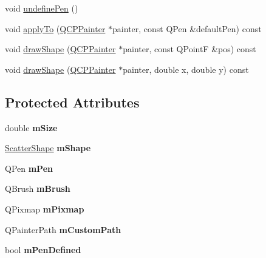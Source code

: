 \begin{DoxyCompactItemize}
void \mbox{\hyperlink{class_q_c_p_scatter_style_acabc2a8c83d650b946f50c3166b6c35e}{undefine\+Pen}} ()
\item 
void \mbox{\hyperlink{class_q_c_p_scatter_style_afd8044ece445300499ca0dc164821e0f}{apply\+To}} (\mbox{\hyperlink{class_q_c_p_painter}{Q\+C\+P\+Painter}} $\ast$painter, const Q\+Pen \&default\+Pen) const
\item 
void \mbox{\hyperlink{class_q_c_p_scatter_style_a89b5105e6027bfcbfeefed9d201b607c}{draw\+Shape}} (\mbox{\hyperlink{class_q_c_p_painter}{Q\+C\+P\+Painter}} $\ast$painter, const Q\+PointF \&pos) const
\item 
void \mbox{\hyperlink{class_q_c_p_scatter_style_a95c297b114c77c22428ef40f54620ddf}{draw\+Shape}} (\mbox{\hyperlink{class_q_c_p_painter}{Q\+C\+P\+Painter}} $\ast$painter, double x, double y) const
\end{DoxyCompactItemize}
\subsection*{Protected Attributes}
\begin{DoxyCompactItemize}
\item 
\mbox{\label{class_q_c_p_scatter_style_a757da98671eb06b221979373ac2cec91}} 
double {\bfseries m\+Size}
\item 
\mbox{\label{class_q_c_p_scatter_style_af1b327f35f107ed108290187bbc8c7c6}} 
\mbox{\hyperlink{class_q_c_p_scatter_style_adb31525af6b680e6f1b7472e43859349}{Scatter\+Shape}} {\bfseries m\+Shape}
\item 
\mbox{\label{class_q_c_p_scatter_style_a0f6a85e6d1e3ae1ca1b6efb4d4cdfe17}} 
Q\+Pen {\bfseries m\+Pen}
\item 
\mbox{\label{class_q_c_p_scatter_style_a1b9c6ab10aebcaf236f1f45d1d6d64d1}} 
Q\+Brush {\bfseries m\+Brush}
\item 
\mbox{\label{class_q_c_p_scatter_style_a7697346c89b19d4cd1d8dd33319ec9e3}} 
Q\+Pixmap {\bfseries m\+Pixmap}
\item 
\mbox{\label{class_q_c_p_scatter_style_a813cb074744dc5a2f59cc99d6a10c6f0}} 
Q\+Painter\+Path {\bfseries m\+Custom\+Path}
\item 
\mbox{\label{class_q_c_p_scatter_style_a84ef5aa591ddba07b440f597e1669e78}} 
bool {\bfseries m\+Pen\+Defined}
\end{DoxyCompactItemize}


